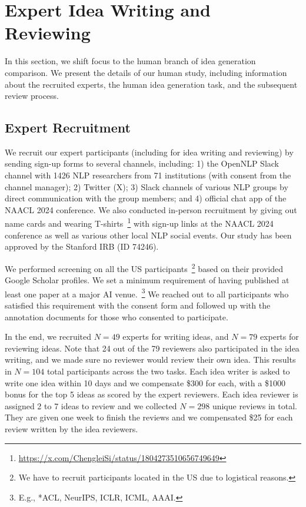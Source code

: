 \section{Expert Idea Writing and Reviewing}
\label{sec:human_study}
In this section, we shift focus to the human branch of idea generation comparison. We present the details of our human study, including information about the recruited experts, the human idea generation task, and the subsequent review process. 


\subsection{Expert Recruitment}

We recruit our expert participants (including for idea writing and reviewing) by sending sign-up forms to several channels, including: 1) the OpenNLP Slack channel with 1426 NLP researchers from 71 institutions (with consent from the channel manager); 2) Twitter (X); 3) Slack channels of various NLP groups by direct communication with the group members; and 4) official chat app of the NAACL 2024 conference. We also conducted in-person recruitment by giving out name cards and wearing T-shirts~\footnote {\url{https://x.com/ChengleiSi/status/1804273510656749649}} with sign-up links at the NAACL 2024 conference as well as various other local NLP social events. Our study %
has been approved by the Stanford IRB (ID 74246). 

We performed screening on all the US participants~\footnote{We have to recruit participants located in the US due to logistical reasons.} based on their provided Google Scholar profiles. We set a minimum requirement of having published at least one paper at a major AI venue.~\footnote{E.g., *ACL, NeurIPS, ICLR, ICML, AAAI.} We reached out to all participants who satisfied this requirement with the consent form and followed up with the annotation documents for those who consented to participate. %

In the end, we recruited $N = 49$ experts for writing ideas, and $N = 79$ experts for reviewing ideas. 
Note that 24 out of the 79 reviewers also participated in the idea writing, and we made sure no reviewer would review their own idea. This results in $N = 104$ total participants across the two tasks. 
Each idea writer is asked to write one idea within 10 days and we compensate \$300 for each, with a \$1000 bonus for the top 5 ideas as scored by the expert reviewers. 
Each idea reviewer is assigned 2 to 7 ideas to review and we collected $N = 298$ unique reviews in total. 
They are given one week to finish the reviews and we compensated \$25 for each review written by the idea reviewers. 

